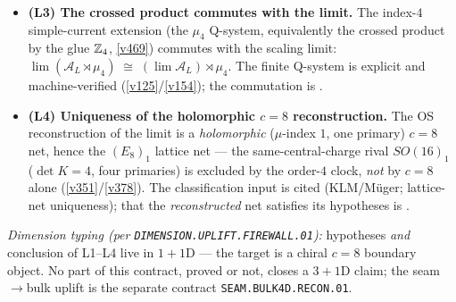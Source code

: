 \begin{itemize}
  executed at the finite level (measured $c=8.005$, $(E_8)_1$ vacuum character
  $[1,0,248,0,4124,0,34752]$, $k=1$, $\det D_8=4\to\det E_8=1$); C6 is the written-out
  quasi-free theorem, C7 stays cited.
\item \textbf{(L3) The crossed product commutes with the limit.} The index-$4$ simple-current
  extension (the $\mu_4$ Q-system, equivalently the crossed product by the glue
  $\mathbb Z_4$, \vref{v469}) commutes with the scaling limit:
  $\lim(\mathcal A_L\rtimes\mu_4)\;\cong\;(\lim\mathcal A_L)\rtimes\mu_4$. The finite Q-system
  is explicit and machine-verified (\vref{v125}/\vref{v154}); the commutation is \mO.
\item \textbf{(L4) Uniqueness of the holomorphic $c=8$ reconstruction.} The OS reconstruction of
  the limit is a \emph{holomorphic} ($\mu$-index $1$, one primary) $c=8$ net, hence the
  $(E_8)_1$ lattice net --- the same-central-charge rival $SO(16)_1$ ($\det K=4$, four
  primaries) is excluded by the order-$4$ clock, \emph{not} by $c=8$ alone
  (\vref{v351}/\vref{v378}). The classification input is cited (KLM/M\"uger; lattice-net
  uniqueness); that the \emph{reconstructed} net satisfies its hypotheses is \mO.
\end{itemize}
\emph{Dimension typing (per \texttt{DIMENSION.UPLIFT.FIREWALL.01}):} hypotheses \emph{and}
conclusion of L1--L4 live in $1{+}1$D --- the target is a chiral $c{=}8$ boundary object.  No
part of this contract, proved or not, closes a $3{+}1$D claim; the seam$\to$bulk uplift is the
separate contract \texttt{SEAM.BULK4D.RECON.01}.

